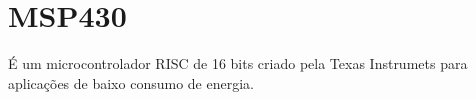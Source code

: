 \section{MSP430} %
\label{sec:msp430}

É um microcontrolador RISC de 16 bits criado pela Texas Instrumets para aplicações de baixo consumo de energia.

